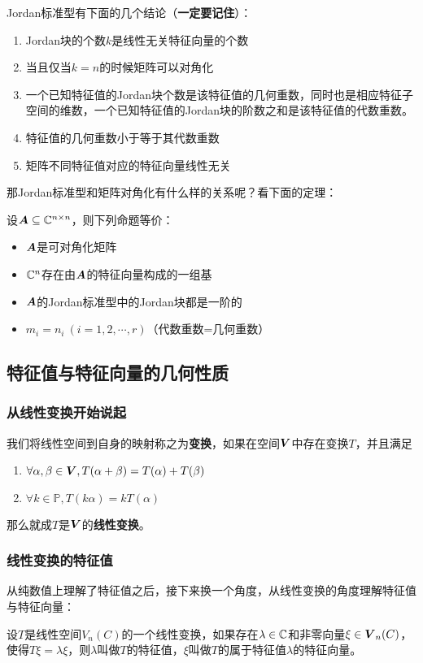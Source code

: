 \documentclass[12pt, a4paper, oneside, UTF8]{ctexbook}
\begin{document}
Jordan标准型有下面的几个结论（\textbf{一定要记住}）：
\begin{enumerate}[leftmargin=4em]
    \item Jordan块的个数$k$是线性无关特征向量的个数
    \item 当且仅当$k=n$的时候矩阵可以对角化
    \item 一个已知特征值的Jordan块个数是该特征值的几何重数，同时也是相应特征子空间的维数，一个已知特征值的Jordan块的阶数之和是该特征值的代数重数。
    \item 特征值的几何重数小于等于其代数重数
    \item 矩阵不同特征值对应的特征向量线性无关
\end{enumerate}

那Jordan标准型和矩阵对角化有什么样的关系呢？看下面的定理：
\begin{them}{}{}
    设$\boldsymbol{A}\subseteq \mathbb{C}^{n\times n}$，则下列命题等价：
    \begin{itemize}
        \item $\boldsymbol{A}$是可对角化矩阵
        \item $\mathbb{C}^n$存在由$\boldsymbol{A}$的特征向量构成的一组基
        \item $\boldsymbol{A}$的Jordan标准型中的Jordan块都是一阶的
        \item $m_i=n_i\ (i=1,2,\cdots,r)$（代数重数=几何重数）
    \end{itemize}
\end{them}
\subsection{特征值与特征向量的几何性质}
\subsubsection{从线性变换开始说起}
我们将线性空间到自身的映射称之为\textbf{变换}，如果在空间$\boldsymbol{V}$中存在变换$T$，并且满足\begin{enumerate}
    \item $\forall\alpha,\beta\in\boldsymbol{V}, T(\alpha+\beta)=T(\alpha)+T(\beta)$
    \item $\forall k\in \mathbb{P}, T(k\alpha)=kT(\alpha)$
\end{enumerate}

那么就成$T$是$\boldsymbol{V}$的\textbf{线性变换}。
\subsubsection{线性变换的特征值}
从纯数值上理解了特征值之后，接下来换一个角度，从线性变换的角度理解特征值与特征向量：
\begin{defn}{}{}
    设$T$是线性空间$V_n(C)$的一个线性变换，如果存在$\lambda\in\mathbb{C}$和非零向量$\xi\in\boldsymbol{V}_n(C)$，使得$T\xi=\lambda\xi$，则$\lambda$叫做$T$的特征值，$\xi$叫做$T$的属于特征值$\lambda$的特征向量。
\end{defn}
\end{document}
